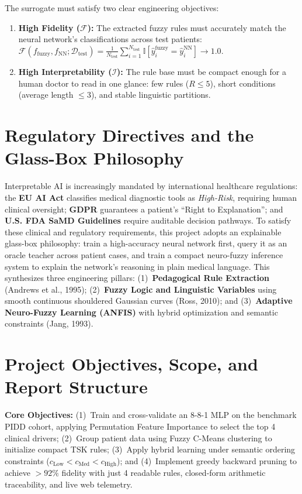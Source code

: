 \documentclass{report}
\begin{document}
The surrogate must satisfy two clear engineering objectives:
\begin{enumerate}
    \setlength{\itemsep}{0pt}
    \setlength{\parskip}{0pt}
    \item \textbf{High Fidelity ($\mathcal{F}$):} The extracted fuzzy rules must accurately match the neural network's classifications across test patients: $\mathcal{F}(f_{\text{fuzzy}}, f_{\text{NN}}; \mathcal{D}_{\text{test}}) = \frac{1}{N_{\text{test}}} \sum_{i=1}^{N_{\text{test}}} \mathbb{I}[ \hat{y}^{\text{fuzzy}}_i = \hat{y}^{\text{NN}}_i ] \to 1.0$.
    \item \textbf{High Interpretability ($\mathcal{I}$):} The rule base must be compact enough for a human doctor to read in one glance: few rules ($R \le 5$), short conditions (average length $\le 3$), and stable linguistic partitions.
\end{enumerate}

\section{Regulatory Directives and the Glass-Box Philosophy}

Interpretable AI is increasingly mandated by international healthcare regulations: the \textbf{EU AI Act} classifies medical diagnostic tools as \textit{High-Risk}, requiring human clinical oversight; \textbf{GDPR} guarantees a patient's ``Right to Explanation''; and \textbf{U.S. FDA SaMD Guidelines} require auditable decision pathways. To satisfy these clinical and regulatory requirements, this project adopts an explainable glass-box philosophy: train a high-accuracy neural network first, query it as an oracle teacher across patient cases, and train a compact neuro-fuzzy inference system to explain the network's reasoning in plain medical language. This synthesizes three engineering pillars: (1)~\textbf{Pedagogical Rule Extraction} (Andrews et al., 1995); (2)~\textbf{Fuzzy Logic and Linguistic Variables} using smooth continuous shouldered Gaussian curves (Ross, 2010); and (3)~\textbf{Adaptive Neuro-Fuzzy Learning (ANFIS)} with hybrid optimization and semantic constraints (Jang, 1993).

\section{Project Objectives, Scope, and Report Structure}

\textbf{Core Objectives:} (1)~Train and cross-validate an 8-8-1 MLP on the benchmark PIDD cohort, applying Permutation Feature Importance to select the top 4 clinical drivers; (2)~Group patient data using Fuzzy C-Means clustering to initialize compact TSK rules; (3)~Apply hybrid learning under semantic ordering constraints ($c_{\text{Low}} < c_{\text{Med}} < c_{\text{High}}$); and (4)~Implement greedy backward pruning to achieve $>92\%$ fidelity with just 4 readable rules, closed-form arithmetic traceability, and live web telemetry.
\end{document}
